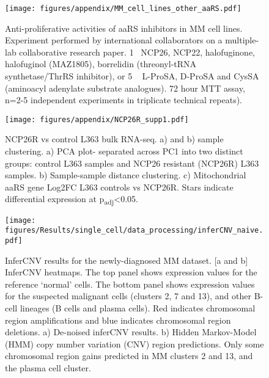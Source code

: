 \begin{figure}[h]
\centering
\texttt{[image: figures/appendix/MM\_cell\_lines\_other\_aaRS.pdf]}
\caption[aaRS inhibitors anti-proliferative activity in MM cell lines]{Anti-proliferative activities of aaRS inhibitors in MM cell lines.
Experiment performed by international collaborators on a multiple-lab collaborative research paper\cite{bottpreclinical2022}.
1\si{\micro\Molar} NCP26, NCP22, halofuginone, halofuginol (MAZ1805), borrelidin (threonyl-tRNA synthetase/ThrRS inhibitor), or 5 \si{\micro\Molar} L-ProSA, D-ProSA and CysSA (aminoacyl adenylate substrate analogues).
72 hour MTT assay, n=2-5 independent experiments in triplicate technical repeats).
}
\label{fig:sup_cell_line_aaRS}
\end{figure}

\begin{figure}[h]
\centering
\texttt{[image: figures/appendix/NCP26R\_supp1.pdf]}
\caption[NCP26R bulk RNA-seq clustering]{NCP26R vs control L363 bulk RNA-seq.
a) and b) sample clustering.
a) PCA plot- separated across PC1 into two distinct groups: control L363 samples and NCP26 resistant (NCP26R) L363 samples.
b) Sample-sample distance clustering.
c) Mitochondrial aaRS gene Log2FC L363 controls vs NCP26R. Stars indicate differential expression at p\textsubscript{adj}<0.05.
}
\label{fig:sup_NCP26R_bulk}
\end{figure}

\afterpage{\clearpage}


\begin{figure}[h]
    \centering
    \texttt{[image: figures/Results/single\_cell/data\_processing/inferCNV\_naive.pdf]}
    \caption[inferCNV- newly-diagnosed MM]{InferCNV results for the newly-diagnosed MM dataset.
    [a and b] InferCNV heatmaps.
        The top panel shows expression values for the reference `normal' cells.
        The bottom panel shows expression values for the suspected malignant cells (clusters 2, 7 and 13), and other B-cell lineages (B cells and plasma cells).
        Red indicates chromosomal region amplifications and blue indicates chromosomal region deletions.
    a) De-noised inferCNV results.
    b) Hidden Markov-Model (HMM) copy number variation (CNV) region predictions.
        Only some chromosomal region gains predicted in MM clusters 2 and 13, and the plasma cell cluster.
    }
    \label{fig:inferCNV_naive}
\end{figure}
%